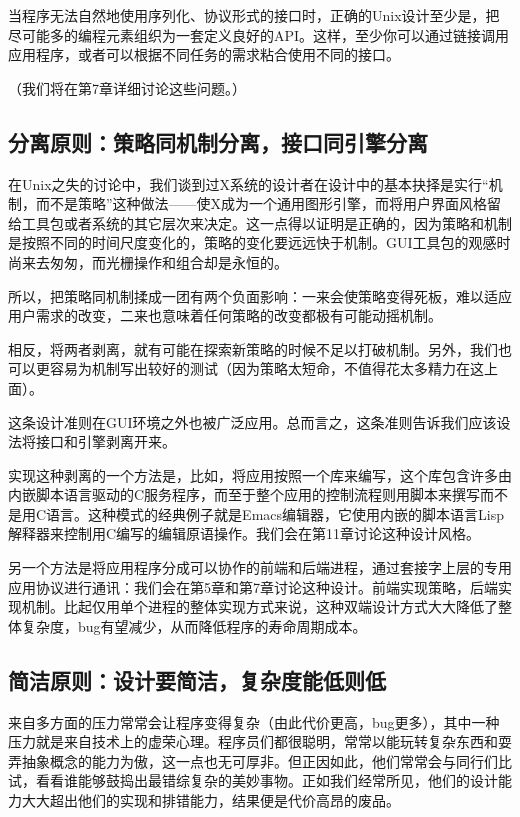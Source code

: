 \documentclass[12pt,oneside]{book}
\begin{document}
当程序无法自然地使用序列化、协议形式的接口时，正确的Unix设计至少是，把尽可能多的编程元素组织为一套定义良好的API。这样，至少你可以通过链接调用应用程序，或者可以根据不同任务的需求粘合使用不同的接口。

（我们将在第7章详细讨论这些问题。）


\subsection{分离原则：策略同机制分离，接口同引擎分离}
在Unix之失的讨论中，我们谈到过X系统的设计者在设计中的基本抉择是实行“机制，而不是策略”这种做法——使X成为一个通用图形引擎，而将用户界面风格留给工具包或者系统的其它层次来决定。这一点得以证明是正确的，因为策略和机制是按照不同的时间尺度变化的，策略的变化要远远快于机制。GUI工具包的观感时尚来去匆匆，而光栅操作和组合却是永恒的。

所以，把策略同机制揉成一团有两个负面影响：一来会使策略变得死板，难以适应用户需求的改变，二来也意味着任何策略的改变都极有可能动摇机制。

相反，将两者剥离，就有可能在探索新策略的时候不足以打破机制。另外，我们也可以更容易为机制写出较好的测试（因为策略太短命，不值得花太多精力在这上面）。

这条设计准则在GUI环境之外也被广泛应用。总而言之，这条准则告诉我们应该设法将接口和引擎剥离开来。

实现这种剥离的一个方法是，比如，将应用按照一个库来编写，这个库包含许多由内嵌脚本语言驱动的C服务程序，而至于整个应用的控制流程则用脚本来撰写而不是用C语言。这种模式的经典例子就是Emacs编辑器，它使用内嵌的脚本语言Lisp解释器来控制用C编写的编辑原语操作。我们会在第11章讨论这种设计风格。

另一个方法是将应用程序分成可以协作的前端和后端进程，通过套接字上层的专用应用协议进行通讯：我们会在第5章和第7章讨论这种设计。前端实现策略，后端实现机制。比起仅用单个进程的整体实现方式来说，这种双端设计方式大大降低了整体复杂度，bug有望减少，从而降低程序的寿命周期成本。


\subsection{简洁原则：设计要简洁，复杂度能低则低}
来自多方面的压力常常会让程序变得复杂（由此代价更高，bug更多），其中一种压力就是来自技术上的虚荣心理。程序员们都很聪明，常常以能玩转复杂东西和耍弄抽象概念的能力为傲，这一点也无可厚非。但正因如此，他们常常会与同行们比试，看看谁能够鼓捣出最错综复杂的美妙事物。正如我们经常所见，他们的设计能力大大超出他们的实现和排错能力，结果便是代价高昂的废品。
\end{document}

